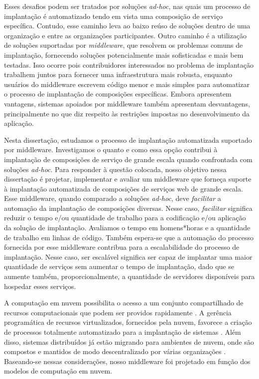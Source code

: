 Esses desafios podem ser tratados por soluções \emph{ad-hoc},
nas quais um processo de implantação é automatizado tendo em vista
uma composição de serviço específica.
Contudo, esse caminho leva ao baixo reúso de soluções
dentro de uma organização e entre as organizações participantes.
Outro caminho é a utilização de soluções suportadas por \emph{middleware},
que resolvem os problemas comuns de implantação,
fornecendo soluções potencialmente mais sofisticadas e mais bem testadas.
Isso ocorre pois contribuidores interessados no problema de implantação
trabalhem juntos para fornecer uma infraestrutura mais robusta,
enquanto usuários do middleware escrevem código menor e mais simples
para automatizar o processo de implantação de composições específicas.
Embora apresentem vantagens, sistemas apoiados por middleware
também apresentam desvantagens, principalmente no que diz respeito
às restrições impostas no desenvolvimento da aplicação.

Nesta dissertação, estudamos o processo de implantação automatizada suportado por middleware. 
Investigamos o quanto e como essa opção
contribui à implantação de composições de serviço de grande escala
quando confrontada com soluções \emph{ad-hoc}.
Para responder à questão colocada, nosso objetivo nessa dissertação é 
projetar, implementar e avaliar
um middleware que forneça suporte à implantação automatizada de composições de serviços web
de grande escala.
Esse middleware, quando comparado a soluções \emph{ad-hoc},
deve \emph{facilitar} a automação da implantação de composições diversas.
Nesse caso, \emph{facilitar} significa reduzir o tempo e/ou quantidade de trabalho
para a codificação e/ou aplicação da solução de implantação.
Avaliamos o tempo em homens*horas e a quantidade de trabalho
em linhas de código.
Também espera-se que a automação do processo fornecida por esse middleware
contribua para a escalabilidade do processo de implantação.
Nesse caso, ser escalável significa ser capaz de implantar uma maior quantidade
de serviços sem aumentar o tempo de implantação, dado que se aumente também,
proporcionalmente, a quantidade de servidores disponíveis para hospedar esses serviços.

A computação em nuvem possibilita o acesso a um conjunto compartilhado de recursos computacionais que podem ser providos rapidamente \cite{Nist2011Cloud}.
A gerência programática de recursos virtualizados, fornecidos pela nuvem, favorece a criação de processos totalmente automatizado para a implantação de sistemas \cite{Humble2011Continuous}.   
Além disso, sistemas distribuídos já estão migrando para ambientes de nuvem, onde são compostos e mantidos de modo descentralizado por várias organizações \cite{Steen2011VeryLarge}.
Baseando-se nessas considerações, nosso middleware foi projetado em função dos modelos de computação em nuvem.

